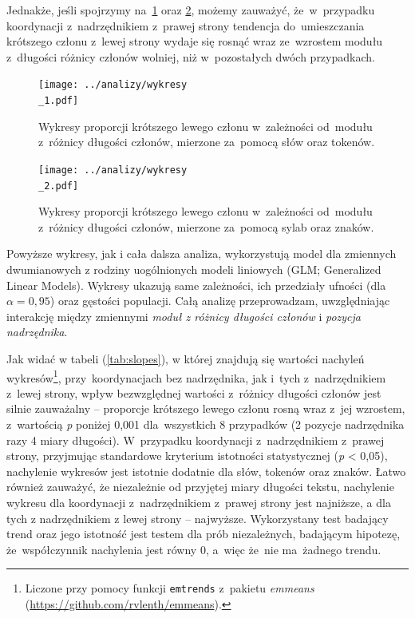 \documentclass[licencjacka]{pracamgr_Kogni}
\begin{document}
Jednakże, jeśli spojrzymy na~\ref{wykresy} oraz \ref{wykresy2}, możemy zauważyć, że~w~przypadku koordynacji z~nadrzędnikiem z~prawej strony tendencja do~umieszczania krótszego członu z~lewej strony wydaje się rosnąć wraz ze~wzrostem modułu z~długości różnicy członów wolniej, niż w~pozostałych dwóch przypadkach. 
\begin{figure}
    \centering
    \texttt{[image: ../analizy/wykresy\\\_1.pdf]}
    \caption[b]{Wykresy proporcji krótszego lewego członu w~zależności od~modułu z~różnicy długości członów, mierzone za~pomocą słów oraz tokenów.}
    \label{wykresy}
\end{figure}
\begin{figure}
    \centering
    \texttt{[image: ../analizy/wykresy\\\_2.pdf]}
    \caption[b]{Wykresy proporcji krótszego lewego członu w~zależności od~modułu z~różnicy długości członów, mierzone za~pomocą sylab oraz znaków.}
    \label{wykresy2}
\end{figure}
\newpage

Powyższe wykresy, jak i cała dalsza analiza, wykorzystują model dla zmiennych dwumianowych z rodziny uogólnionych modeli liniowych (GLM; Generalized Linear Models). Wykresy ukazują same zależności, ich przedziały ufności (dla $\alpha = 0,95$) oraz gęstości populacji.
Całą analizę przeprowadzam, uwzględniając interakcję między zmiennymi \textit{moduł z różnicy długości członów} i \textit{pozycja nadrzędnika}.

Jak widać w tabeli (\ref{tab:slopes}), w której znajdują się wartości nachyleń wykresów\footnote{Liczone przy pomocy funkcji \texttt{emtrends} z~pakietu \textit{emmeans} (\url{https://github.com/rvlenth/emmeans}).}, przy~koordynacjach bez nadrzędnika, jak i~tych z~nadrzędnikiem z~lewej strony, wpływ bezwzględnej wartości z~różnicy długości członów jest silnie zauważalny -- proporcje krótszego lewego członu rosną wraz z~jej wzrostem, z~wartością \textit{p} poniżej 0,001 dla~wszystkich 8 przypadków (2 pozycje nadrzędnika razy 4 miary długości). 
W~przypadku koordynacji z~nadrzędnikiem z~prawej strony, przyjmując standardowe kryterium istotności statystycznej (\textit{p} < 0,05), nachylenie wykresów jest istotnie dodatnie dla słów, tokenów oraz znaków.
Łatwo również zauważyć, że niezależnie od przyjętej miary długości tekstu, nachylenie wykresu dla koordynacji z~nadrzędnikiem z~prawej strony jest najniższe, a dla tych z nadrzędnikiem z lewej strony -- najwyższe.
Wykorzystany test badający trend oraz jego istotność jest testem dla prób niezależnych, badającym hipotezę, że~współczynnik nachylenia jest równy 0, a~więc że~nie ma~żadnego trendu.
\end{document}
